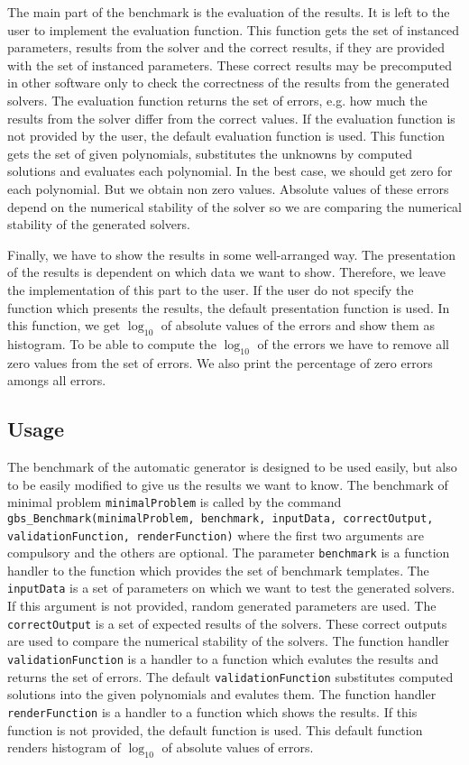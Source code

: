 The main part of the benchmark is the evaluation of the results. It is left to the user to implement the evaluation function. This function gets the set of instanced parameters, results from the solver and the correct results, if they are provided with the set of instanced parameters. These correct results may be precomputed in other software only to check the correctness of the results from the generated solvers. The evaluation function returns the set of errors, e.g. how much the results from the solver differ from the correct values. If the evaluation function is not provided by the user, the default evaluation function is used. This function gets the set of given polynomials, substitutes the unknowns by computed solutions and evaluates each polynomial. In the best case, we should get zero for each polynomial. But we obtain non zero values. Absolute values of these errors depend on the numerical stability of the solver so we are comparing the numerical stability of the generated solvers.

Finally, we have to show the results in some well-arranged way. The presentation of the results is dependent on which data we want to show. Therefore, we leave the implementation of this part to the user. If the user do not specify the function which presents the results, the default presentation function is used. In this function, we get $\log_{10}$ of absolute values of the errors and show them as histogram. To be able to compute the $\log_{10}$ of the errors we have to remove all zero values from the set of errors. We also print the percentage of zero errors amongs all errors.

\subsection{Usage}
The benchmark of the automatic generator is designed to be used easily, but also to be easily modified to give us the results we want to know. The benchmark of minimal problem \texttt{minimalProblem} is called by the command \texttt{gbs\_Benchmark(minimal\-Prob\-lem, bench\-mark, input\-Data, correctOutput, validationFunction, render\-Func\-tion)} where the first two arguments are compulsory and the others are optional. The parameter \texttt{benchmark} is a function handler to the function which provides the set of benchmark templates. The \texttt{input\-Data} is a set of parameters on which we want to test the generated solvers. If this argument is not provided, random generated parameters are used. The \texttt{correctOutput} is a set of expected results of the solvers. These correct outputs are used to compare the numerical stability of the solvers. The function handler \texttt{validationFunction} is a handler to a function which evalutes the results and returns the set of errors. The default \texttt{validationFunction} substitutes computed solutions into the given polynomials and evalutes them. The function handler \texttt{renderFunction} is a handler to a function which shows the results. If this function is not provided, the default function is used. This default function renders histogram of $\log_{10}$ of absolute values of errors.

